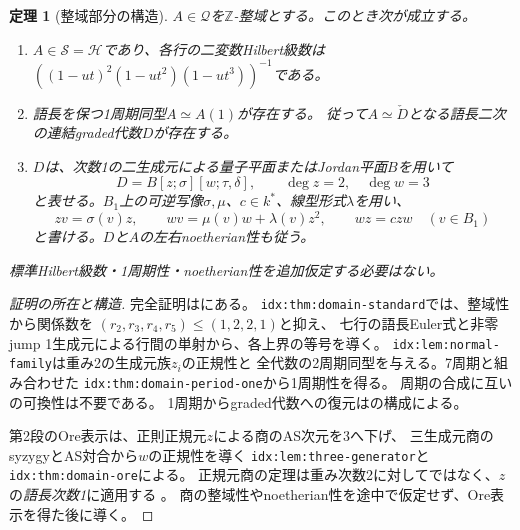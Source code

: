 \documentclass[11pt,a4paper]{ltjsarticle}
\newtheorem{theorem}{定理}[section]
\theoremstyle{definition}
\newcommand{\ZZ}{\mathbb Z}
\begin{document}
\begin{theorem}[整域部分の構造]\label{thm:domain-structure}
$A\in\mathcal Q$を$\ZZ$-整域とする。このとき次が成立する。
\begin{enumerate}
\item $A\in\mathcal S=\mathcal H$であり、各行の二変数Hilbert級数は
$((1-ut)^2(1-ut^2)(1-ut^3))^{-1}$である。
\item 語長を保つ1周期同型$A\simeq A(1)$が存在する。
従って$A\simeq\check D$となる語長二次の連結graded代数$D$が存在する。
\item $D$は、次数1の二生成元による量子平面またはJordan平面$B$を用いて
\[
D=B[z;\sigma][w;\tau,\delta],\qquad
\deg z=2,\quad\deg w=3
\]
と表せる。$B_1$上の可逆写像$\sigma,\mu$、$c\in k^*$、線型形式$\lambda$を用い、
\[
zv=\sigma(v)z,\qquad
wv=\mu(v)w+\lambda(v)z^2,\qquad wz=czw
\quad(v\in B_1)
\]
と書ける。$D$と$A$の左右noetherian性も従う。
\end{enumerate}
標準Hilbert級数・1周期性・noetherian性を追加仮定する必要はない。
\end{theorem}
\begin{proof}[証明の所在と構造]
完全証明はにある。
\texttt{idx:thm:domain-standard}では、整域性から関係数を
$(r_2,r_3,r_4,r_5)\leq(1,2,2,1)$と抑え、
七行の語長Euler式と非零jump 1生成元による行間の単射から、各上界の等号を導く。
\texttt{idx:lem:normal-family}は重み2の生成元族$z_i$の正規性と
全代数の2周期同型を与える。7周期と組み合わせた
\texttt{idx:thm:domain-period-one}から1周期性を得る。
周期の合成に互いの可換性は不要である。
1周期からgraded代数への復元は\cite[Lemma 3.4]{VdB}の構成による。

第2段のOre表示は、正則正規元$z$による商のAS次元を3へ下げ、
三生成元商のsyzygyとAS対合から$w$の正規性を導く
\texttt{idx:lem:three-generator}と\texttt{idx:thm:domain-ore}による。
正規元商の定理は重み次数2に対してではなく、$z$の\emph{語長次数1}に適用する
\cite[Lemma 1.1, Corollary 1.2]{RZ}。
商の整域性やnoetherian性を途中で仮定せず、Ore表示を得た後に導く。
\end{proof}
\end{document}
